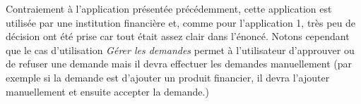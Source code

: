 Contraiement à l'application présentée précédemment, cette application est utilisée par une institution financière et, comme pour l'application 1, très peu de décision ont été prise car tout était assez clair dans l'énoncé.
Notons cependant que le cas d'utilisation \textit{Gérer les demandes} permet à l'utilisateur d'approuver ou de refuser une demande mais il devra effectuer les demandes manuellement
(par exemple si la demande est d'ajouter un produit financier, il devra l'ajouter manuellement et ensuite accepter la demande.)\\
